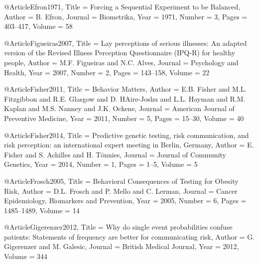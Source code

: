 @Article{Efron1971,
  Title                    = {Forcing a Sequential Experiment to be Balanced},
  Author                   = {B. Efron},
  Journal                  = {Biometrika},
  Year                     = {1971},
  Number                   = {3},
  Pages                    = {403--417},
  Volume                   = {58}
}

@Article{Figueiras2007,
  Title                    = {Lay perceptions of serious illnesses: An adapted version of the Revised Illness Perception Questionnaire (IPQ-R) for healthy people},
  Author                   = {M.F. Figueiras and N.C. Alves},
  Journal                  = {Psychology and Health},
  Year                     = {2007},
  Number                   = {2},
  Pages                    = {143--158},
  Volume                   = {22}
}

@Article{Fisher2011,
  Title                    = {Behavior Matters},
  Author                   = {E.B. Fisher and M.L. Fitzgibbon and R.E. Glasgow and D. HAire-Joshu and L.L. Hayman and R.M. Kaplan and M.S. Nanney and J.K. Ockene},
  Journal                  = {American Journal of Preventive Medicine},
  Year                     = {2011},
  Number                   = {5},
  Pages                    = {15--30},
  Volume                   = {40}
}

@Article{Fisher2014,
  Title                    = {Predictive genetic testing, risk communication, and risk perception: an international expert meeting in Berlin, Germany},
  Author                   = {E. Fisher and S. Achilles and H. Tönnies},
  Journal                  = {Journal of Community Genetics},
  Year                     = {2014},
  Number                   = {1},
  Pages                    = {1--5},
  Volume                   = {5}
}

@Article{Frosch2005,
  Title                    = {Behavioral Consequences of Testing for Obesity Risk},
  Author                   = {D.L. Frosch and P. Mello and C. Lerman},
  Journal                  = {Cancer Epidemiology, Biomarkers and Prevention},
  Year                     = {2005},
  Number                   = {6},
  Pages                    = {1485--1489},
  Volume                   = {14}
}

@Article{Gigerenzer2012,
  Title                    = {Why do single event probabilities confuse patients: Statements of frequency are better for communicating risk},
  Author                   = {G. Gigerenzer and M. Galesic},
  Journal                  = {British Medical Journal},
  Year                     = {2012},
  Volume                   = {344}
}

